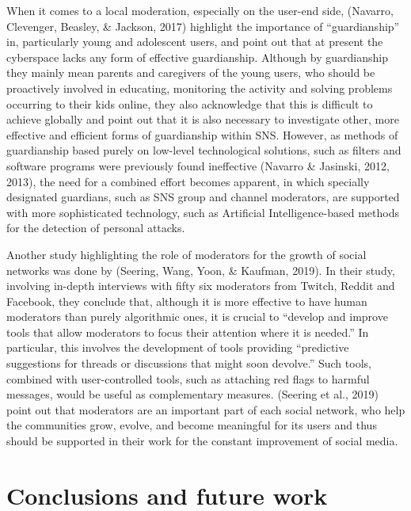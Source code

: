 \documentclass[10pt,dvipsnames]{scrartcl}
\begin{document}
When it comes to a local moderation, especially on the user-end side,
(Navarro, Clevenger, Beasley, \& Jackson, 2017) highlight the importance
of ``guardianship'' in, particularly young and adolescent users, and
point out that at present the cyberspace lacks any form of effective
guardianship. Although by guardianship they mainly mean parents and
caregivers of the young users, who should be proactively involved in
educating, monitoring the activity and solving problems occurring to
their kids online, they also acknowledge that this is difficult to
achieve globally and point out that it is also necessary to investigate
other, more effective and efficient forms of guardianship within SNS.
However, as methods of guardianship based purely on low-level
technological solutions, such as filters and software programs were
previously found ineffective (Navarro \& Jasinski, 2012, 2013), the need
for a combined effort becomes apparent, in which specially designated
guardians, such as SNS group and channel moderators, are supported with
more sophisticated technology, such as Artificial Intelligence-based
methods for the detection of personal attacks.

Another study highlighting the role of moderators for the growth of
social networks was done by (Seering, Wang, Yoon, \& Kaufman, 2019). In
their study, involving in-depth interviews with fifty six moderators
from Twitch, Reddit and Facebook, they conclude that, although it is
more effective to have human moderators than purely algorithmic ones, it
is crucial to ``develop and improve tools that allow moderators to focus
their attention where it is needed.'' In particular, this involves the
development of tools providing ``predictive suggestions for threads or
discussions that might soon devolve.'' Such tools, combined with
user-controlled tools, such as attaching red flags to harmful messages,
would be useful as complementary measures. (Seering et al., 2019) point
out that moderators are an important part of each social network, who
help the communities grow, evolve, and become meaningful for its users
and thus should be supported in their work for the constant improvement
of social media.

\section{Conclusions and future work}
\label{conclusions}
\end{document}

